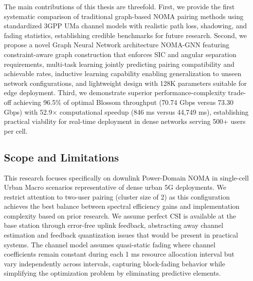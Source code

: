 The main contributions of this thesis are threefold. First, we provide the first systematic comparison of traditional graph-based NOMA pairing methods using standardized 3GPP UMa channel models with realistic path loss, shadowing, and fading statistics, establishing credible benchmarks for future research. Second, we propose a novel Graph Neural Network architecture NOMA-GNN featuring constraint-aware graph construction that enforces SIC and angular separation requirements, multi-task learning jointly predicting pairing compatibility and achievable rates, inductive learning capability enabling generalization to unseen network configurations, and lightweight design with 128K parameters suitable for edge deployment. Third, we demonstrate superior performance-complexity trade-off achieving 96.5\% of optimal Blossom throughput (70.74 Gbps versus 73.30 Gbps) with 52.9× computational speedup (846 ms versus 44,749 ms), establishing practical viability for real-time deployment in dense networks serving 500+ users per cell.

\subsection{Scope and Limitations}

This research focuses specifically on downlink Power-Domain NOMA in single-cell Urban Macro scenarios representative of dense urban 5G deployments. We restrict attention to two-user pairing (cluster size of 2) as this configuration achieves the best balance between spectral efficiency gains and implementation complexity based on prior research. We assume perfect CSI is available at the base station through error-free uplink feedback, abstracting away channel estimation and feedback quantization issues that would be present in practical systems. The channel model assumes quasi-static fading where channel coefficients remain constant during each 1 ms resource allocation interval but vary independently across intervals, capturing block-fading behavior while simplifying the optimization problem by eliminating predictive elements.

